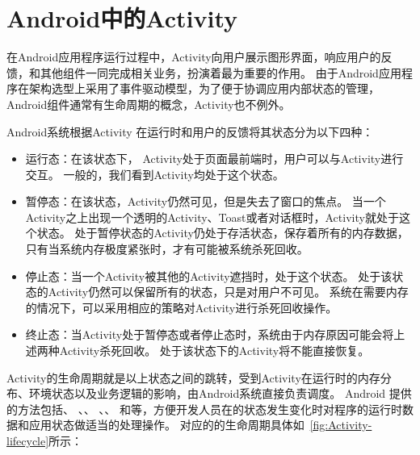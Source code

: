 \section{Android中的Activity}



在Android应用程序运行过程中，Activity向用户展示图形界面，响应用户的反馈，和其他组件一同完成相关业务，扮演着最为重要的作用\cite{Activity2:online}。
由于Android应用程序在架构选型上采用了事件驱动模型，为了便于协调应用内部状态的管理，Android组件通常有生命周期的概念，Activity也不例外。

Android系统根据Activity 在运行时和用户的反馈将其状态分为以下四种：
\begin{itemize}
		\setlength{\itemsep}{-5pt}
		
	\item 运行态：在该状态下， Activity处于页面最前端时，用户可以与Activity进行交互。
	一般的，我们看到Activity均处于这个状态。
	
	\item 暂停态：在该状态，Activity仍然可见，但是失去了窗口的焦点。
	当一个Activity之上出现一个透明的Activity、Toast或者对话框时，Activity就处于这个状态。
	处于暂停状态的Activity仍处于存活状态，保存着所有的内存数据，只有当系统内存极度紧张时，才有可能被系统杀死回收。
	
	\item 停止态：当一个Activity被其他的Activity遮挡时，处于这个状态。
	处于该状态的Activity仍然可以保留所有的状态，只是对用户不可见。
	系统在需要内存的情况下，可以采用相应的策略对Activity进行杀死回收操作。
	
	\item 终止态：当Activity处于暂停态或者停止态时，系统由于内存原因可能会将上述两种Activity杀死回收。
	处于该状态下的Activity将不能直接恢复。
\end{itemize}

Activity的生命周期就是以上状态之间的跳转，受到Activity在运行时的内存分布、环境状态以及业务逻辑的影响，由Android系统直接负责调度。
Android 提供的方法包括、 、、 、、 和等，方便开发人员在的状态发生变化时对程序的运行时数据和应用状态做适当的处理操作。
对应的的生命周期具体如~\autoref{fig:Activity-lifecycle}所示：


